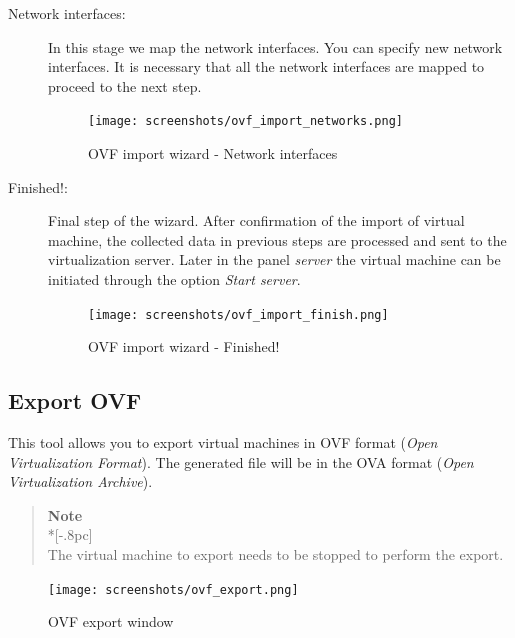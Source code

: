 \begin{description}
    \item[Network interfaces:] In this stage we map the network interfaces. You can specify new network interfaces.
         It is necessary that all the network interfaces are mapped to proceed to the next step.
		\begin{figure}[H]
            \begin{center}
            \texttt{[image: screenshots/ovf\_import\_networks.png]}
            \caption{OVF import wizard - Network interfaces}
            \label{fig:ovf_import_networks}
            \end{center}
        \end{figure}

    \item[Finished!:] Final step of the wizard. After confirmation of the import of virtual machine, the collected data in previous steps are processed and sent to the virtualization server. Later in the panel \emph{server} the virtual machine can be initiated through the option \emph{Start server}.
		\begin{figure}[H]
			\begin{center}
			\texttt{[image: screenshots/ovf\_import\_finish.png]}
            \caption{OVF import wizard - Finished!}
			\label{fig:ovf_import_finish}
			\end{center}
		\end{figure}

\end{description}

\subsection{Export OVF}
This tool allows you to export virtual machines in OVF format (\emph{Open Virtualization Format}).
The generated file will be in the OVA format (\emph{Open Virtualization Archive}).

\begin{quote}
	{\large \bf Note} \\*[-.8pc]
	\underline{\hspace{6in}} \\
    The virtual machine to export needs to be stopped to perform the export.
\end{quote}

\begin{figure}[H]
	\begin{center}
	\texttt{[image: screenshots/ovf\_export.png]}
	\caption{OVF export window}
	\label{fig:ovf_export}
	\end{center}
\end{figure}


